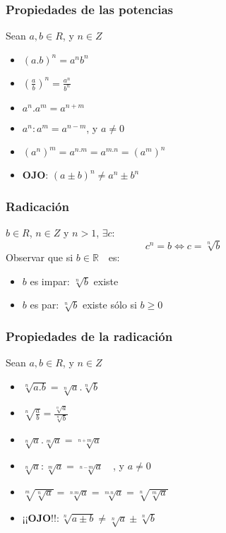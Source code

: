    \subsubsection{Propiedades de las potencias}
    Sean $a,b \in R$, y $n \in Z$
    \begin{itemize}
     \item $(a.b)^n=a^n b^n$
     \item $(\frac{a}{b})^n=\frac{a^n}{b^n}$
     \item $ a^n . a^m=a^{n+m}$
     \item $ a^n : a^m=a^{n-m} $, y $a \neq 0$
     \item $ (a^n)^m= a^{n.m}=a^{m.n}=(a^m)^n$
     \item \textbf{OJO}: $(a \pm b)^n \neq a^n\pm b^n$ 
    \end{itemize}
    \subsubsection{Radicación}
    $b \in R$, $n \in Z$ y $n>1$, $\exists c$:
    \[ c^n=b \Leftrightarrow c=\sqrt[n]{b}\]
    Observar que si $b\in \mathbb{R} \quad$es:
    \begin{itemize}
     \item $b$ es impar: $\sqrt[n]{b}$ existe
     \item $b$ es par: $\sqrt[n]{b}$ existe sólo si $b \geq 0$
    \end{itemize}
    \subsubsection{Propiedades de la radicación}
    Sean $a,b \in R$, y $n \in Z$
    \begin{itemize}
     \item $\sqrt[n]{a.b}=\sqrt[n]{a}. \sqrt[n]{b}$
     \item $\sqrt[n]{ \frac{a}{b}}=\frac{ \sqrt[n]{a} }{ \sqrt[n]{b}}$
     \item $ \sqrt[n]{a} . \sqrt[m]{a}=\sqrt[n+m]{a}$
     \item $ \sqrt[n]{a} : \sqrt[m]{a}=\sqrt[n-m]{a} \quad$, y $a \neq 0$
     \item $ \sqrt[m]{ \sqrt[n]{a} }= \sqrt[n.m]{a}= \sqrt[m.n]{a}=\sqrt[n]{\sqrt[m]{a}}$
     \item $\textbf{¡¡OJO!!}: \sqrt[n]{a \pm b} \neq \sqrt[n]{a}\pm \sqrt[n]{b}$ 

    \end{itemize}
    
